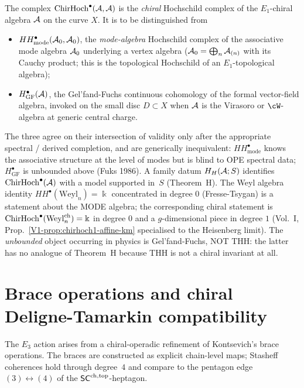 \begin{remark}%
\label{rem:chd-three-hochschilds}%
%
The complex $\mathrm{ChirHoch}^\bullet(\mathcal{A}, \mathcal{A})$ is the
\emph{chiral} Hochschild complex of the $E_1$-chiral algebra $\mathcal{A}$ on
the curve $X$. It is to be distinguished from
\begin{itemize}
\item $HH^\bullet_{\mathrm{mode}}(\mathcal{A}_0, \mathcal{A}_0)$, the \emph{mode-algebra}
Hochschild complex of the associative mode algebra $\mathcal{A}_0$ underlying a
vertex algebra ($\mathcal{A}_0 = \bigoplus_n \mathcal{A}_{(n)}$ with its Cauchy product;
this is the topological Hochschild of an $E_1$-topological algebra);
\item $H^\bullet_{\mathrm{GF}}(\mathcal{A})$, the Gel'fand-Fuchs continuous
cohomology of the formal vector-field algebra, invoked on the small
disc $D \subset X$ when $\mathcal{A}$ is the Virasoro or $\cW$-algebra at
generic central charge.
\end{itemize}
The three agree on their intersection of validity only after the
appropriate spectral / derived completion, and are generically
inequivalent: $HH^\bullet_{\mathrm{mode}}$ knows the associative
structure at the level of modes but is blind to OPE spectral data;
$H^\bullet_{\mathrm{GF}}$ is unbounded above (Fuks 1986).  A family
datum $H_H(\mathcal{A};S)$ identifies $\mathrm{ChirHoch}^\bullet(\mathcal{A})$ with a model
supported in~$S$ (Theorem~H). The Weyl algebra identity $HH^\bullet(\mathrm{Weyl}_n)
= \Bbbk$ concentrated in degree $0$ (Fresse-Tsygan) is a statement
about the MODE algebra; the corresponding chiral statement is
$\mathrm{ChirHoch}^\bullet(\mathrm{Weyl}^{\mathrm{ch}}_n) = \Bbbk$ in degree
$0$ and a $g$-dimensional piece in degree $1$
(Vol.~I, Prop.~\ref*{V1-prop:chirhoch1-affine-km} specialised to the
Heisenberg limit). The \emph{unbounded} object occurring in physics is
Gel'fand-Fuchs, NOT THH: the latter has no analogue of Theorem~H
because THH is not a chiral invariant at all.
\end{remark}

\section{Brace operations and chiral Deligne-Tamarkin compatibility}
\label{sec:chd-braces}

The $E_3$ action arises from a chiral-operadic refinement of
Kontsevich's brace operations. The braces are constructed as
explicit chain-level maps; Stasheff coherences hold through
degree~$4$ and compare to the pentagon edge
$(3)\leftrightarrow(4)$ of the $\mathsf{SC}^{\mathrm{ch},\mathrm{top}}$-heptagon.

